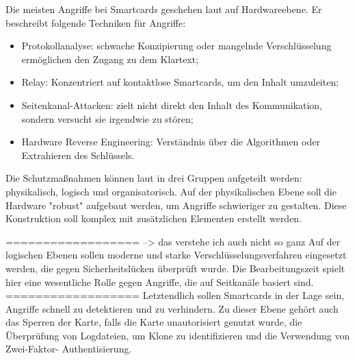 Die meisten Angriffe bei Smartcards geschehen laut \cite{refmas:ASSS} auf Hardwareebene.
Er beschreibt folgende Techniken für Angriffe:

\begin{itemize}
    \item Protokollanalyse: schwache Konzipierung oder mangelnde Verschlüsselung ermöglichen den Zugang 
    zu dem Klartext; 
    \item Relay: Konzentriert auf kontaktlose Smartcards, um den Inhalt umzuleiten;
    \item Seitenkanal-Attacken: zielt nicht direkt den Inhalt des Kommunikation, sondern versucht sie
    irgendwie zu stören;
    \item Hardware Reverse Engineering: Verständnis über die Algorithmen oder Extrahieren des Schlüssels.
\end{itemize}


Die Schutzmaßnahmen können laut \cite{refmas:ASSS} in drei Gruppen aufgeteilt werden: physikalisch,
logisch und organisatorisch. Auf der physikalischen Ebene soll die Hardware "robust" aufgebaut werden,
um Angriffe schwieriger zu gestalten. Diese Konstruktion soll komplex mit zusätzlichen Elementen erstellt
werden. 



================== --> das verstehe ich auch nicht so ganz 
Auf der logischen Ebenen sollen moderne und starke Verschlüsselungsverfahren
eingesetzt werden, die gegen Sicherheitslücken überprüft wurde. Die Bearbeitungszeit spielt hier
eine wesentliche Rolle gegen Angriffe, die auf Seitkanäle basiert sind. 
==================
Letztendlich sollen Smartcards in der Lage sein, Angriffe schnell zu detektieren und zu verhindern.
Zu dieser Ebene gehört auch das Sperren der Karte, falls die Karte unautorisiert genutzt wurde, 
die Überprüfung von Logdateien, um Klone zu identifizieren und die Verwendung von Zwei-Faktor-
Authentisierung.
